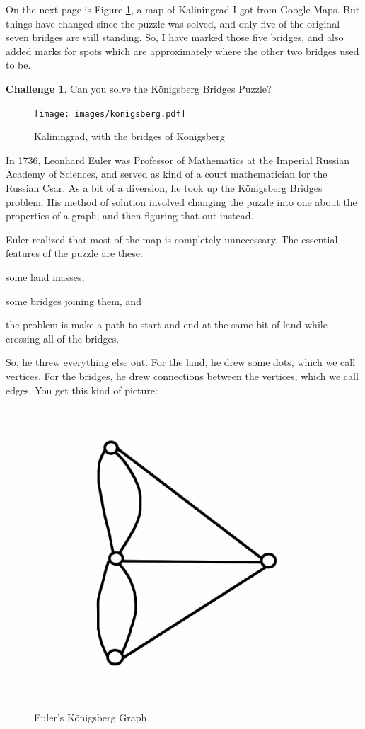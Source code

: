 \documentclass[12pt,letterpaper]{article}
\theoremstyle{definition}
\newtheorem*{challenge}{Challenge}
\begin{document}
On the next page is Figure \ref{figure:konigsberg}, a map of Kaliningrad I got from Google Maps. But things have changed since the puzzle was solved, and only five of the original seven bridges are still standing. So, I have marked those five bridges, and also added marks for spots which are approximately where the other two bridges used to be.

\begin{challenge}Can you solve the K\"{o}nigsberg Bridges Puzzle?
\end{challenge}

\clearpage

\begin{figure}[h]
\centering
\begin{sideways}
\texttt{[image: images/konigsberg.pdf]}
\end{sideways}
\caption{Kaliningrad, with the bridges of K\"{o}nigsberg}
\label{figure:konigsberg}
\end{figure}

In 1736, Leonhard Euler was Professor of Mathematics at the Imperial Russian Academy of Sciences, and served as
kind of a court mathematician for the Russian Csar. As a bit of a diversion, he took up the K\"{o}nigsberg Bridges
problem.  His method of solution involved changing the puzzle into one about the properties of a graph, and then
figuring that out instead.

Euler realized that most of the map is completely unnecessary. The essential features of the puzzle are these:
\begin{compactitem}
\item some land masses,
\item some bridges joining them, and
\item the problem is make a path to start and end at the same bit of land while crossing all of the bridges.
\end{compactitem}

So, he threw everything else out. For the land, he drew some dots, which we call vertices. For the bridges, he
drew connections between the vertices, which we call edges. You get this kind of picture:

\begin{figure}[h]
\centering
\includegraphics[width=.3\textwidth]{images/konigsberg-graph.png}
\caption{Euler's K\"{o}nigsberg Graph}
\label{figure:konigsberg-graph}
\end{figure}
\end{document}
